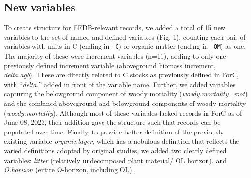 \documentclass[, manuscript]{copernicus}
\begin{document}
\subsection{New variables}

To create structure for EFDB-relevant records, we added a total of 15
new variables to the set of named and defined variables (Fig. 1),
counting each pair of variables with units in C (ending in \texttt{\_C})
or organic matter (ending in \texttt{\_OM}) as one. The majority of
these were increment variables (n=11), adding to only one previously
defined increment variable (aboveground biomass increment,
\emph{delta.agb}). These are directly related to C stocks as previously
defined in ForC, with ``\emph{delta.}'' added in front of the variable
name. Further, we added variables capturing the belowground component of
woody mortality (\emph{woody.mortality\_root}) and the combined
aboveground and belowground components of woody mortality
(\emph{woody.mortality}). Although most of these variables lacked
records in ForC as of June 08, 2023, their addition gave the structure
such that records can be populated over time. Finally, to provide better
definition of the previously existing variable \emph{organic.layer},
which has a nebulous definition that reflects the varied definitions
adopted by original studies, we added two clearly defined variables:
\emph{litter} (relatively undecomposed plant material/ OL horizon), and
\emph{O.horizon} (entire O-horizon, including OL).
\end{document}
